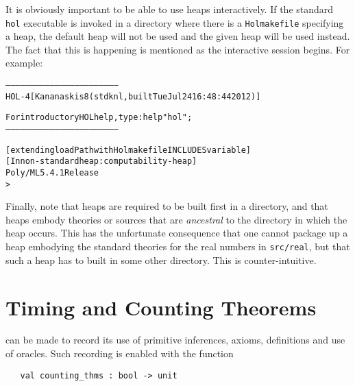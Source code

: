 It is obviously important to be able to use heaps interactively.
If the standard \texttt{hol} executable is invoked in a directory where there is a \texttt{Holmakefile} specifying a heap, the default heap will not be used and the given heap will be used instead.
The fact that this is happening is mentioned as the interactive session begins.
For example:
\begin{samepage}
\begin{alltt}
---------------------------------------------------------------------
       HOL-4 [Kananaskis 8 (stdknl, built Tue Jul 24 16:48:44 2012)]

       For introductory HOL help, type: help "hol";
---------------------------------------------------------------------

[extending loadPath with Holmakefile INCLUDES variable]
[In non-standard heap: computability-heap]
Poly/ML 5.4.1 Release
>
\end{alltt}
\end{samepage}

Finally, note that heaps are required to be built first in a directory, and that heaps embody theories or \ML{} sources that are \emph{ancestral} to the directory in which the heap occurs.
This has the unfortunate consequence that one cannot package up a heap embodying the standard theories for the real numbers in \texttt{src/real}, but that such a heap has to built in some other directory.
This is counter-intuitive.

\section{Timing and Counting Theorems}



\HOL{} can be made to record its use of primitive
inferences, axioms, definitions and use of oracles.  Such recording is
enabled with the function

\begin{holboxed}
\begin{verbatim}
   val counting_thms : bool -> unit
\end{verbatim}
\end{holboxed}

